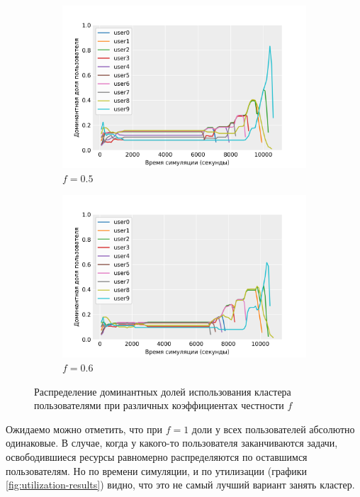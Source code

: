 \begin{figure}[h!]
    \begin{subfigure}{0.49\linewidth}
        \centering
        \includegraphics[width=\linewidth]{images/fair_share_05}
        \caption{$f = 0.5$}
        \label{fig:fair_share_05}
    \end{subfigure}
    \begin{subfigure}{0.49\linewidth}
        \centering
        \includegraphics[width=\linewidth]{images/fair_share_06}
        \caption{$f = 0.6$}
        \label{fig:fair_share_06}
    \end{subfigure}
    \caption{Распределение доминантных долей использования кластера пользователями при различных коэффициентах честности $f$}
    \label{fig:fairness-results}
\end{figure}

Ожидаемо можно отметить, что при $f = 1$ доли у всех пользователей абсолютно одинаковые. В случае, когда у какого-то пользователя заканчиваются задачи, освободившиеся ресурсы равномерно распределяются по оставшимся пользователям. Но по времени симуляции, и по утилизации (графики \ref{fig:utilization-results}) видно, что это не самый лучший вариант занять кластер.

